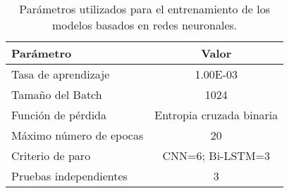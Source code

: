 
\begin{table}[t]
\caption{Parámetros utilizados para el entrenamiento de los modelos basados en redes neuronales.} \label{table:param_redes}
\begin{center}

\begin{tabular}{lc}
\hline
\rowcolor[HTML]{C0C0C0} 
\textbf{Parámetro}      & \textbf{Valor}           \\ \hline
Tasa de aprendizaje     & 1.00E-03                 \\ \hline
Tamaño del Batch        & 1024                     \\ \hline
Función de pérdida      & Entropia cruzada binaria \\ \hline
Máximo número de epocas & 20                       \\ \hline
Criterio de paro    & CNN=6; Bi-LSTM=3         \\ \hline
Pruebas independientes  & 3                        \\ \hline
\end{tabular}

\end{center}
\end{table}